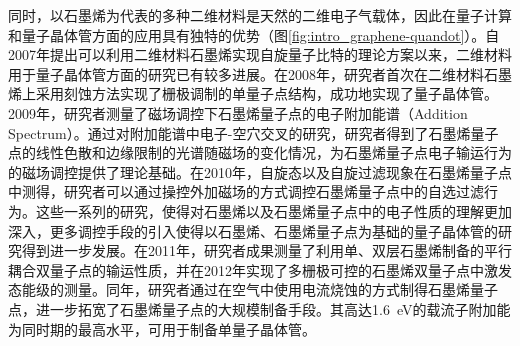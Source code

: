     同时，以石墨烯为代表的多种二维材料是天然的二维电子气载体，因此在量子计算和量子晶体管方面的应用具有独特的优势（图\ref{fig:intro_graphene-quandot}）。自2007年提出可以利用二维材料石墨烯实现自旋量子比特的理论方案以来，二维材料用于量子晶体管方面的研究已有较多进展。在2008年，研究者首次在二维材料石墨烯上采用刻蚀方法实现了栅极调制的单量子点结构，成功地实现了量子晶体管。2009年，研究者测量了磁场调控下石墨烯量子点的电子附加能谱（Addition Spectrum）。通过对附加能谱中电子-空穴交叉的研究，研究者得到了石墨烯量子点的线性色散和边缘限制的光谱随磁场的变化情况，为石墨烯量子点电子输运行为的磁场调控提供了理论基础。在2010年，自旋态以及自旋过滤现象在石墨烯量子点中测得，研究者可以通过操控外加磁场的方式调控石墨烯量子点中的自选过滤行为。这些一系列的研究，使得对石墨烯以及石墨烯量子点中的电子性质的理解更加深入，更多调控手段的引入使得以石墨烯、石墨烯量子点为基础的量子晶体管的研究得到进一步发展。在2011年，研究者成果测量了利用单、双层石墨烯制备的平行耦合双量子点的输运性质，并在2012年实现了多栅极可控的石墨烯双量子点中激发态能级的测量。同年，研究者通过在空气中使用电流烧蚀的方式制得石墨烯量子点，进一步拓宽了石墨烯量子点的大规模制备手段。其高达\SI{1.6}{\electronvolt}的载流子附加能为同时期的最高水平，可用于制备单量子晶体管。

